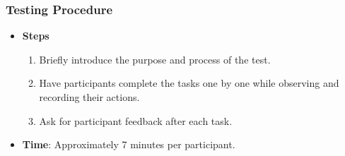 \documentclass[12pt]{article}
\begin{document}
    \subsubsection*{Testing Procedure}
    \begin{itemize}
        \item\textbf{Steps}
            \begin{enumerate}
                \item Briefly introduce the purpose and process of the test.
                \item Have participants complete the tasks one by one while observing and recording their actions.
                \item Ask for participant feedback after each task.
            \end{enumerate}

        \item \textbf{Time}: Approximately 7 minutes per participant.
    \end{itemize}
\end{document}
